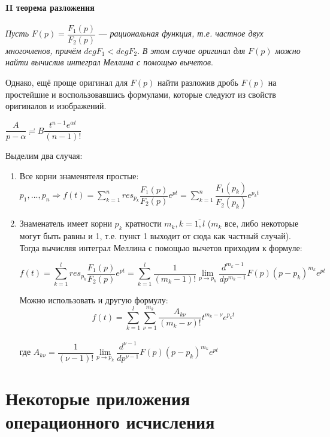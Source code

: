 \documentclass[a4paper, 12pt]{report}
\begin{document}
\paragraph{II теорема разложения}
\textit{Пусть} $F(p) = \dfrac{F_1(p)}{F_2(p)}$ --- \textit{рациональная функция, т.е. частное двух многочленов, причём }$degF_1 < degF_2$. \textit{В этом случае оригинал для} $F(p)$ \textit{можно найти вычислив интеграл Меллина с помощью вычетов}.

\par\bigskip

Однако, ещё проще оригинал для $F(p)$ найти разложив дробь $F(p)$ на простейшие и воспользовавшись формулами, которые следуют из свойств оригиналов и изображений.

\begin{center}
    $\dfrac{A}{p - \alpha} \risingdotseq B \dfrac{t^{n-1}e^{\alpha t}}{(n - 1)!}$
\end{center}

Выделим два случая:

\begin{enumerate}
    \item Все корни знаменятеля простые: $p_1, ..., p_n \Rightarrow f(t) = \sum\limits_{k=1}^{n}res_{p_k}\dfrac{F_1(p)}{F_2(p)}e^{pt} = \sum\limits_{k=1}^{n}\dfrac{F_1(p_k)}{F_2(p_k)}e^{p_kt}$
    \item Знаменатель имеет корни $p_k$ кратности $m_k, k = \overline{1, l}$ ($m_k$ все, либо некоторые могут быть равны и 1, т.е. пункт 1 выходит от сюда как частный случай). Тогда вычисляя интеграл Меллина с помощью вычетов приходим к формуле:
    
    $$f(t) = \sum\limits_{k=1}^{l}res_{p_k}\dfrac{F_1(p)}{F_2(p)}e^{pt} = \sum\limits_{k=1}^{l}\dfrac{1}{(m_k - 1)!}\lim\limits_{p \rightarrow p_k}\dfrac{d^{m_k-1}}{dp^{m_k-1}}F(p)(p - p_k)^{m_k}e^{pt}$$
    
    Можно использовать и другую формулу:
    $$f(t) = \sum\limits_{k=1}^{l}\sum\limits_{\nu=1}^{m_k}\dfrac{A_{k\nu}}{(m_k - \nu)!}t^{m_k - \nu}e^{p_kt}$$\\ где $A_{k\nu} = \dfrac{1}{(\nu - 1)!}\lim\limits_{p \rightarrow p_k}\dfrac{d^{\nu-1}}{dp^{\nu-1}}F(p)(p - p_k)^{m_k}e^{pt}$
\end{enumerate}




\section{Некоторые приложения операционного исчисления}
\end{document}
